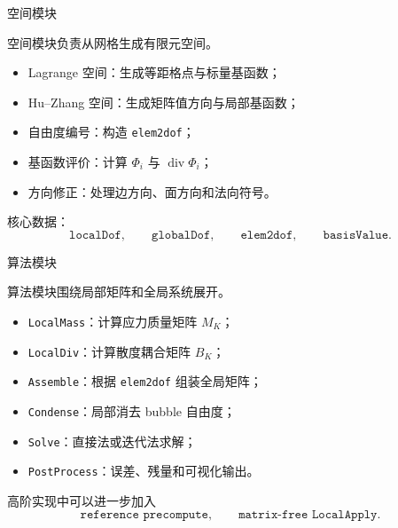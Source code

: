\documentclass[aspectratio=169,professionalfonts]{ctexbeamer}
\begin{document}
\begin{frame}{空间模块}

空间模块负责从网格生成有限元空间。

\vspace{0.4em}

\begin{itemize}
  \item Lagrange 空间：生成等距格点与标量基函数；
  \item Hu--Zhang 空间：生成矩阵值方向与局部基函数；
  \item 自由度编号：构造 \texttt{elem2dof}；
  \item 基函数评价：计算 $\Phi_i$ 与 $\operatorname{div}\Phi_i$；
  \item 方向修正：处理边方向、面方向和法向符号。
\end{itemize}

\vspace{0.5em}

核心数据：
$$
\texttt{localDof},
\qquad
\texttt{globalDof},
\qquad
\texttt{elem2dof},
\qquad
\texttt{basisValue}.
$$

\end{frame}

\begin{frame}{算法模块}

算法模块围绕局部矩阵和全局系统展开。

\vspace{0.4em}

\begin{itemize}
  \item \texttt{LocalMass}：计算应力质量矩阵 $M_K$；
  \item \texttt{LocalDiv}：计算散度耦合矩阵 $B_K$；
  \item \texttt{Assemble}：根据 \texttt{elem2dof} 组装全局矩阵；
  \item \texttt{Condense}：局部消去 bubble 自由度；
  \item \texttt{Solve}：直接法或迭代法求解；
  \item \texttt{PostProcess}：误差、残量和可视化输出。
\end{itemize}

\vspace{0.4em}

高阶实现中可以进一步加入
$$
\texttt{reference precompute},
\qquad
\texttt{matrix-free LocalApply}.
$$

\end{frame}
\end{document}

